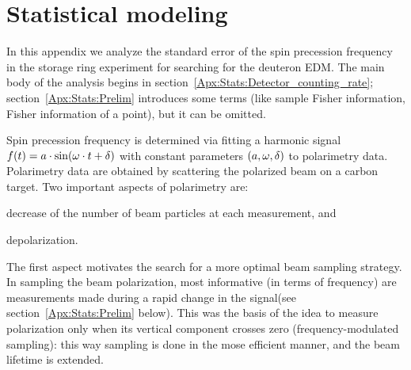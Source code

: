 \newcommand{\cnt}{c}
\newcommand{\meas}{\epsilon}
\newcommand{\dt}{\Delta t}
\newcommand{\dtm}{\dt_{\meas}}
\newcommand{\dtc}{\dt_{\cnt}}
\newcommand{\Ncm}{{n_{\sfrac{\cnt}{\meas}}}}
\newcommand{\Nmnd}{{n_{\sfrac{\meas}{zc}}}}
\newcommand{\Nnd}{{n_{zc}}}
\newcommand{\Nm}{{n_{\meas}}}
\newcommand{\Ncnt}{{n_{\cnt}}}
\newcommand{\LTb}{\tau_b}
\newcommand{\LTd}{\tau_d}
\newcommand{\lamb}{\lambda_b}
\newcommand{\lamd}{\lambda_d}

\newcommand{\pars}{\boldsymbol{\theta}}
\DeclareDocumentCommand{\XpctO}{m}{\Xpct{#1}[\pars_0]}
\DeclareDocumentCommand{\Fisher}{O{}D(){\pars_0}}{I_{#1}(#2)}
\newcommand{\y}{\mathbf{y}}


\chapter{Statistical modeling}\label{Apx:Stats}
In this appendix we analyze the standard error of the spin precession frequency in the storage ring
experiment for searching for the deuteron EDM. The main body of the analysis begins
in section~\ref{Apx:Stats:Detector_counting_rate}; section~\ref{Apx:Stats:Prelim} introduces some terms
(like sample Fisher information, Fisher information of a point), but it can be omitted.

Spin precession frequency is determined via fitting a harmonic signal 
$f(t) = a\cdot\sin(\omega\cdot t + \delta)$ with constant parameters $(a,\omega,\delta)$ to polarimetry data.
Polarimetry data are obtained by scattering the polarized beam on a carbon target. Two important aspects
of polarimetry are:
\begin{enumerate*}
	\item decrease of the number of beam particles at each measurement, and
	\item depolarization.
\end{enumerate*}

The first aspect motivates the search for a more optimal beam sampling strategy. In sampling the
beam polarization, most informative (in terms of frequency) are measurements made during a rapid change
in the signal(see section~\ref{Apx:Stats:Prelim} below). This was the basis of the idea to measure
polarization only when its vertical component crosses zero (frequency-modulated sampling): this way
sampling is done in the mose efficient manner, and the beam lifetime is extended. 

